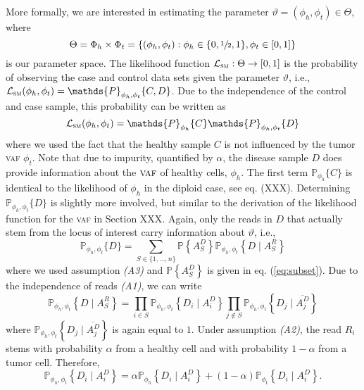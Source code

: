 \documentclass[a4paper,12pt]{article}
\newcommand{\p}[1]{\mathds{P}\left\{#1 \right\}}
\begin{document}
More formally, we are interested in estimating the parameter $\vartheta = (\phi_h, \phi_t) \in \Theta$, where 
\begin{equation}
 \Theta = \Phi_h \times \Phi_t = \{(\phi_h, \phi_t) : \phi_h \in \{0, \sfrac{1}{2}, 1\}, \phi_t \in [0,1] \}
\end{equation}
is our parameter space. The likelihood function $\mathcal{L}_{\textsc{sm}} : \Theta \rightarrow [0,1]$ is the probability of observing the case and control data sets given the parameter $\vartheta$, i.e., $\mathcal{L}_{\textsc{sm}} (\phi_h, \phi_t) = \mathds{P}_{\phi_h, \phi_t} \{C , D\}$. Due to the independence of the control and case sample, this probability can be written as  
\begin{equation}
 \mathcal{L}_{\textsc{sm}} (\phi_h, \phi_t) = \mathds{P}_{\phi_h} \{C\} \mathds{P}_{\phi_h, \phi_t} \{D\} 
\end{equation}
where we used the fact that the healthy sample $C$ is not influenced by the tumor \textsc{vaf} $\phi_t$. Note that due to impurity, quantified by $\alpha$, the disease sample $D$ does provide information about the $\textsc{vaf}$ of healthy cells, $\phi_h$. 
The first term $\mathds{P}_{\phi_h} \{C\}$ is identical to the likelihood of $\phi_h$ in the diploid case, see eq. (XXX). Determining $\mathds{P}_{\phi_h, \phi_t} \{D\} $ is slightly more involved, but similar to the derivation of the likelihood function for the \textsc{vaf} in Section XXX. Again, only the reads in $D$ that actually stem from the locus of interest carry information about $\vartheta$, i.e., 
\begin{equation}
 \mathds{P}_{\phi_h, \phi_t} \{D\} = \sum_{S \in \{1,\dots,n\}} \p{A_S^D} \mathds{P}_{\phi_h, \phi_t} \left\{ D \mid A_S^R \right\}
\end{equation}
where we used assumption \emph{(A3)} and $\p{A_S^D}$ is given in eq. (\ref{eq:subset}). Due to the independence of reads \emph{(A1)}, we can write 
\begin{equation}
 \mathds{P}_{\phi_h, \phi_t} \left\{ D \mid A_S^R \right\} = \prod_{i \in S} \mathds{P}_{\phi_h, \phi_t} \left\{D_i \mid A_i^D\right\} \prod_{j \not\in S} \mathds{P}_{\phi_h, \phi_t} \left\{D_j \mid \overline{A_j^D} \right\}
\end{equation}
where $\mathds{P}_{\phi_h, \phi_t} \left\{D_j \mid \overline{A_j^D} \right\}$ is again equal to $1$. Under assumption \emph{(A2)}, the read $R_i$ stems with probability $\alpha$ from a healthy cell and with probability $1 - \alpha$ from a tumor cell. Therefore, 
\begin{equation}
 \mathds{P}_{\phi_h, \phi_t} \left\{D_i \mid A_i^D\right\} = \alpha \mathds{P}_{\phi_h} \left\{D_i \mid A_i^D\right\} + (1 - \alpha) \mathds{P}_{\phi_t} \left\{D_i \mid A_i^D\right\}. 
\end{equation}
\end{document}
